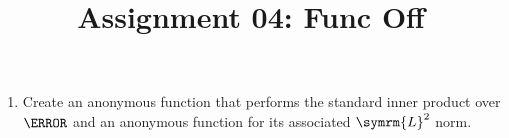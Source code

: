 \documentclass{article}
\title{Assignment 04: Func Off}
\begin{document}
\renderTitle

\begin{enumerate}[leftmargin=*]
	\item
		Create an  anonymous function that performs
		the standard inner product over \(\C\) and an
		 anonymous function for its associated
		\(\symrm{L}^2\) norm.
\end{enumerate}
\end{document}

